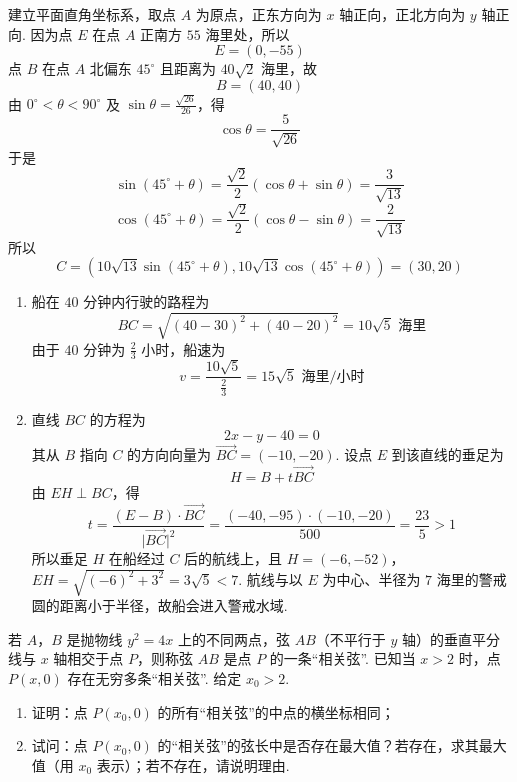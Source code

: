 \begin{solution}
建立平面直角坐标系，取点 \(A\) 为原点，正东方向为 \(x\) 轴正向，正北方向为 \(y\) 轴正向. 因为点 \(E\) 在点 \(A\) 正南方 \(55\) 海里处，所以
\[
E=(0,-55)
\]
点 \(B\) 在点 \(A\) 北偏东 \(45^{\circ}\) 且距离为 \(40\sqrt2\) 海里，故
\[
B=(40,40)
\]
由 \(0^{\circ}<\theta<90^{\circ}\) 及 \(\sin\theta=\frac{\sqrt{26}}{26}\)，得
\[
\cos\theta=\frac5{\sqrt{26}}
\]
于是
\[
\sin(45^{\circ}+\theta)
=\frac{\sqrt2}{2}\left(\cos\theta+\sin\theta\right)
=\frac3{\sqrt{13}}
\]
\[
\cos(45^{\circ}+\theta)
=\frac{\sqrt2}{2}\left(\cos\theta-\sin\theta\right)
=\frac2{\sqrt{13}}
\]
所以
\[
C=\left(10\sqrt{13}\sin(45^{\circ}+\theta),
10\sqrt{13}\cos(45^{\circ}+\theta)\right)=(30,20)
\]
\begin{enumerate}
\item 船在 \(40\) 分钟内行驶的路程为
\[
BC=\sqrt{(40-30)^2+(40-20)^2}=10\sqrt5\text{ 海里}
\]
由于 \(40\) 分钟为 \(\frac23\) 小时，船速为
\[
v=\frac{10\sqrt5}{\frac{2}{3}}=15\sqrt5\text{ 海里/小时}
\]
\item 直线 \(BC\) 的方程为
\[
2x-y-40=0
\]
其从 \(B\) 指向 \(C\) 的方向向量为 \(\overrightarrow{BC}=(-10,-20)\). 设点 \(E\) 到该直线的垂足为
\[
H=B+t\overrightarrow{BC}
\]
由 \(EH\perp BC\)，得
\[
t=\frac{(E-B)\cdot\overrightarrow{BC}}{\lvert\overrightarrow{BC}\rvert^2}
=\frac{(-40,-95)\cdot(-10,-20)}{500}
=\frac{23}{5}>1
\]
所以垂足 \(H\) 在船经过 \(C\) 后的航线上，且
\(H=\left(-6,-52\right)\)，\(EH=\sqrt{(-6)^2+3^2}=3\sqrt5<7\).
航线与以 \(E\) 为中心、半径为 \(7\) 海里的警戒圆的距离小于半径，故船会进入警戒水域.
\end{enumerate}
\end{solution}

\begin{problem}
若 \(A\)，\(B\) 是抛物线 \(y^{2} = 4x\) 上的不同两点，弦 \(AB\)（不平行于 \(y\) 轴）的垂直平分线与 \(x\) 轴相交于点 \(P\)，则称弦 \(AB\) 是点 \(P\) 的一条“相关弦”. 已知当 \(x > 2\) 时，点 \(P(x, 0)\) 存在无穷多条“相关弦”. 给定 \(x_0 > 2\).
\begin{enumerate}
\item 证明：点 \(P(x_0, 0)\) 的所有“相关弦”的中点的横坐标相同；
\item 试问：点 \(P(x_0, 0)\) 的“相关弦”的弦长中是否存在最大值？若存在，求其最大值（用 \(x_0\) 表示）；若不存在，请说明理由.
\end{enumerate}
\end{problem}

